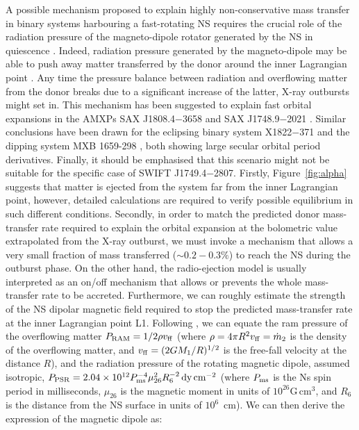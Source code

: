 \documentclass[fleqn,usenatbib]{mnras}
\newcommand{\swiftj}{SWIFT J1749.4$-$2807}
\begin{document}
A possible mechanism proposed to explain highly non-conservative mass transfer in binary systems harbouring a fast-rotating NS requires the crucial role of the radiation pressure of the magneto-dipole rotator generated by the NS in quiescence \citep[see e.g.,][]{Burderi:2003wk,di-Salvo:2008uu}. Indeed, radiation pressure generated by the magneto-dipole may be able to push away matter transferred by the donor around the inner Lagrangian point \citep[radio-ejection, see e.g.,][for a detailed discussion on the model]{Burderi:2001wp, di-Salvo:2008uu}. Any time the pressure balance between radiation and overflowing matter from the donor breaks due to a significant increase of the latter, X-ray outbursts might set in. This mechanism has been suggested to explain fast orbital expansions in the AMXPs SAX J1808.4$-$3658 \citep[see e.g.,][]{di-Salvo:2008uu,Burderi:2009td,Sanna:2017vj} and SAX J1748.9$-$2021 \citep[][]{Sanna:2016ty}. Similar conclusions have been drawn for the eclipsing binary system X1822$-$371 \citep{Burderi:2010tk,Iaria:2015ut} and the dipping system MXB 1659-298 \citep{Iaria:2018tq}, both showing large secular orbital period derivatives. Finally, it should be emphasised that this scenario might not be suitable for the specific case of \swiftj{}. Firstly, Figure~\ref{fig:alpha} suggests that matter is ejected from the system far from the inner Lagrangian point, however, detailed calculations are required to verify possible equilibrium in such different conditions. Secondly, in order to match the predicted donor mass-transfer rate required to explain the orbital expansion at the bolometric value extrapolated from the X-ray outburst, we must invoke a mechanism that allows a very small fraction of mass transferred ($\sim0.2-0.3\%$) to reach the NS during the outburst phase. On the other hand, the radio-ejection model is usually interpreted as an on/off mechanism that allows or prevents the whole mass-transfer rate to be accreted. Furthermore, we can roughly estimate the strength of the NS dipolar magnetic field required to stop the predicted mass-transfer rate at the inner Lagrangian point L1. Following \citet{Burderi:2002wk}, we can equate the ram pressure of the overflowing matter $P_{\rm RAM}=1/2 \rho v_{\rm ff}$ (where $\rho = 4 \pi R^2 v_{\rm ff}=\dot{m}_2$ is the density of the overflowing matter, and $v_{\rm ff}=(2 G M_1/R)^{1/2}$ is the free-fall velocity at the distance $R$), and the radiation pressure of the rotating magnetic dipole, assumed isotropic, $P_{\rm PSR}=2.04\times 10^{12} P^{-4}_{\rm ms}\mu^2_{26}R^{-2}_{6}\,\text{dy}\,\text{cm}^{-2}$ (where $P_{\rm ms}$ is the Ns spin period in milliseconds, $\mu_{26}$ is the magnetic moment in units of $10^{26}\text{G}\,\text{cm}^3$, and $R_{6}$ is the distance from the NS surface in units of $10^{6}$~cm). We can then derive the expression of the magnetic dipole as:
\end{document}
